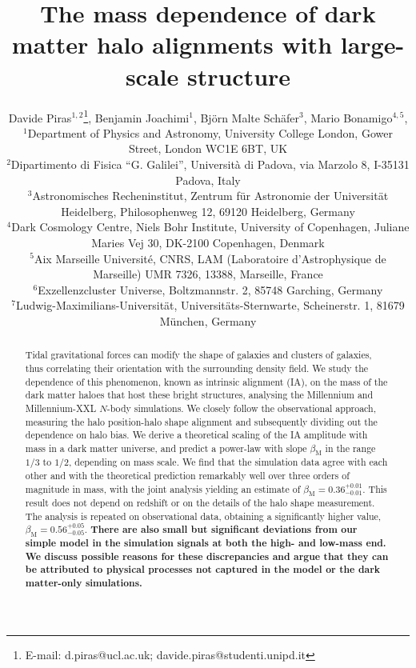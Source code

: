 \documentclass[a4paper,fleqn,usenatbib]{mnras}
\title[The mass dependence of dark matter halo alignments]{The mass dependence of dark matter halo alignments with large-scale structure}
\author[D. Piras et al.]{
Davide Piras$^{1, 2}$\thanks{E-mail: d.piras@ucl.ac.uk; davide.piras@studenti.unipd.it},
Benjamin Joachimi$^{1}$,
Bj\"{o}rn Malte Sch\"{a}fer$^{3}$,
Mario Bonamigo$^{4,5}$, 
\newauthor{Stefan Hilbert$^{6,7}$,
and Edo van Uitert$^{1}$}
\\
$^{1}$Department of Physics and Astronomy, University College London, Gower Street, London WC1E 6BT, UK\\
$^{2}$Dipartimento di Fisica ``G. Galilei'', Universit\`{a} di Padova, via Marzolo 8, I-35131 Padova, Italy\\
$^{3}$Astronomisches Recheninstitut, Zentrum f\"{u}r Astronomie der Universit\"{a}t Heidelberg, Philosophenweg 12, 69120 Heidelberg, Germany\\
$^{4}$Dark Cosmology Centre, Niels Bohr Institute, University of Copenhagen, Juliane Maries Vej 30, DK-2100 Copenhagen, Denmark\\
$^{5}$Aix Marseille Universit\'e, CNRS, LAM (Laboratoire d'Astrophysique de Marseille) UMR 7326, 13388, Marseille, France\\
$^{6}$Exzellenzcluster Universe, Boltzmannstr. 2, 85748 Garching, Germany\\
$^{7}$Ludwig-Maximilians-Universit{\"a}t, Universit{\"a}ts-Sternwarte, Scheinerstr. 1, 81679 M{\"u}nchen, Germany
}
\newenvironment{correction}
 {\bfseries}%
  {}%
\begin{document}
\label{firstpage}
\pagerange{\pageref{firstpage}--\pageref{lastpage}}
\maketitle

\begin{abstract}
Tidal gravitational forces can modify the shape of galaxies and clusters of galaxies, thus correlating their orientation with the surrounding density field. We study the dependence of this phenomenon, known as intrinsic alignment (IA), on the mass of the dark matter haloes that host these bright structures, analysing the Millennium and Millennium-XXL $N$-body simulations. We closely follow the observational approach, measuring the halo position-halo shape alignment and subsequently dividing out the dependence on halo bias.
We derive a theoretical scaling of the IA amplitude with mass in a dark matter universe, and predict a power-law with slope $\beta_{\mathrm{M}}$ in the range $1/3$ to $1/2$, depending on mass scale.
We find that the simulation data agree with each other and with the theoretical prediction remarkably well over three orders of magnitude in mass, with the joint analysis yielding an estimate of $\beta_{\mathrm{M}} = 0.36^{+0.01}_{-0.01}$. This result does not depend on redshift or on the details of the halo shape measurement. The analysis is repeated on observational data, obtaining a significantly higher value, $\beta_{\mathrm{M}} = 0.56^{+0.05}_{-0.05}$.\begin{correction} There are also small but significant deviations from our simple model in the simulation signals at both the high- and low-mass end. We discuss possible reasons for these discrepancies and argue that they can be attributed to physical processes not captured in the model or the dark matter-only simulations.\end{correction}
\end{abstract}
\end{document}
